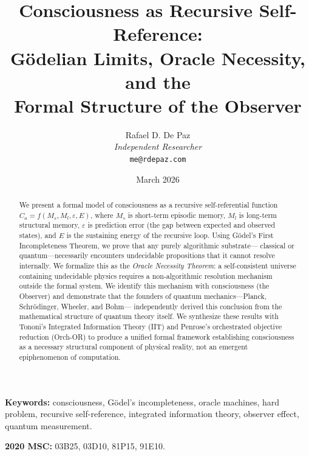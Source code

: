 \documentclass[12pt, a4paper]{article}
\theoremstyle{plain}
\theoremstyle{definition}
\theoremstyle{remark}
\begin{document}
\title{
  \textbf{Consciousness as Recursive Self-Reference: \\
  G\"odelian Limits, Oracle Necessity, and the \\
  Formal Structure of the Observer}
}
\author{
  Rafael D. De Paz \\
  \textit{Independent Researcher} \\
  \texttt{me@rdepaz.com}
}
\date{March 2026}
\maketitle

\begin{abstract}
We present a formal model of consciousness as a recursive self-referential
function $C_a = f(M_s, M_l, \varepsilon, E)$, where $M_s$ is short-term
episodic memory, $M_l$ is long-term structural memory, $\varepsilon$ is
prediction error (the gap between expected and observed states), and $E$ is
the sustaining energy of the recursive loop. Using G\"odel's First
Incompleteness Theorem, we prove that any purely algorithmic substrate---
classical or quantum---necessarily encounters undecidable propositions that
it cannot resolve internally. We formalize this as the \emph{Oracle Necessity
Theorem}: a self-consistent universe containing undecidable physics requires
a non-algorithmic resolution mechanism outside the formal system. We identify
this mechanism with consciousness (the Observer) and demonstrate that the
founders of quantum mechanics---Planck, Schr\"odinger, Wheeler, and Bohm---
independently derived this conclusion from the mathematical structure of
quantum theory itself. We synthesize these results with Tononi's Integrated
Information Theory (IIT) and Penrose's orchestrated objective reduction
(Orch-OR) to produce a unified formal framework establishing consciousness
as a necessary structural component of physical reality, not an emergent
epiphenomenon of computation.
\end{abstract}

\vspace{1em}
\noindent\textbf{Keywords:} consciousness, G\"odel's incompleteness,
oracle machines, hard problem, recursive self-reference, integrated
information theory, observer effect, quantum measurement.

\vspace{0.5em}
\noindent\textbf{2020 MSC:} 03B25, 03D10, 81P15, 91E10.
\end{document}
